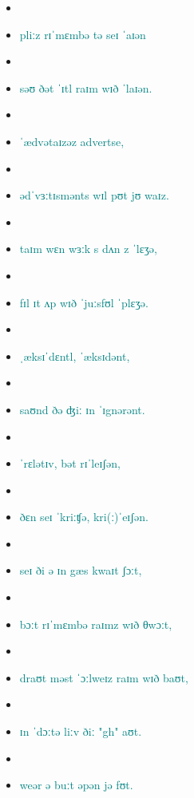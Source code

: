 \begin{itemize}
\item {}
\item \textcolor{teal}{pliːz rɪˈmɛmbə tə seɪ ˈaɪən}
\item {}
\item \textcolor{teal}{səʊ ðət ˈɪtl raɪm wɪð ˈlaɪən.}
\item {}
\item \textcolor{teal}{ˈædvətaɪzəz advertse,}
\item {}
\item \textcolor{teal}{ədˈvɜːtɪsmənts wɪl pʊt jʊ waɪz.}
\item {}
\item \textcolor{teal}{taɪm wɛn wɜːk s dʌn z ˈlɛʒə,}
\item {}
\item \textcolor{teal}{fɪl ɪt ʌp wɪð ˈjuːsfʊl ˈplɛʒə.}
\item {}  
\item \textcolor{teal}{ˌæksɪˈdɛntl, ˈæksɪdənt,}
\item {}
\item \textcolor{teal}{saʊnd ðə ʤiː ɪn ˈɪgnərənt.}
\item {}
\item \textcolor{teal}{ˈrɛlətɪv, bət rɪˈleɪʃən,}
\item {}
\item \textcolor{teal}{ðɛn seɪ ˈkriːʧə, kri(ː)ˈeɪʃən.}
\item {}
\item \textcolor{teal}{seɪ ði ə ɪn gæs kwaɪt ʃɔːt,}
\item {}
\item \textcolor{teal}{bɔːt rɪˈmɛmbə raɪmz wɪð θwɔːt,}
\item {}
\item \textcolor{teal}{draʊt məst ˈɔːlweɪz raɪm wɪð baʊt,}
\item {}
\item \textcolor{teal}{ɪn ˈdɔːtə liːv ðiː "gh" aʊt.}
\item {}
\item \textcolor{teal}{weər ə buːt əpən jə fʊt.}

\end{itemize}
